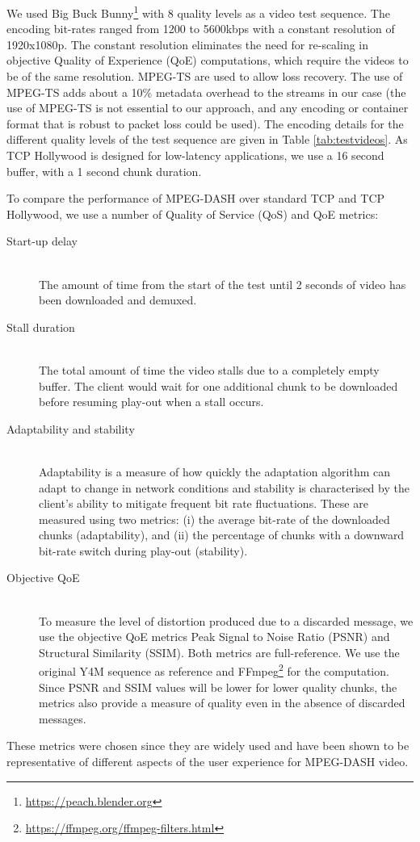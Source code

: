 We used Big Buck Bunny\footnote{\url{https://peach.blender.org}} with 8 quality levels as a video 
test sequence. The encoding bit-rates ranged from 1200 to 5600kbps with a constant resolution of 
1920x1080p. The constant resolution eliminates the need for re-scaling in objective Quality of 
Experience (QoE)
computations, which require the videos to be of the same resolution. MPEG-TS
are used to allow loss recovery. The use of MPEG-TS adds about a
10\% metadata overhead to the streams in our case (the use of MPEG-TS is not
essential to our approach, and any encoding or container format that is robust to packet loss
could be used). The encoding details for the different quality levels of
the test sequence are given in Table \ref{tab:testvideos}.
As TCP Hollywood is designed for low-latency applications, we use a 16 second buffer, with
a 1 second chunk duration.

To compare the performance of MPEG-DASH over standard TCP and TCP Hollywood, we use a number of 
Quality of Service (QoS) and QoE metrics: 
\begin{description}
    \item[Start-up delay] \hfill \\
        The amount of time from the start of the test until 2 seconds of video has been downloaded and demuxed.
    \item[Stall duration] \hfill \\
        The total amount of time the video stalls due to a completely empty buffer. The
        client would wait for one additional chunk to be downloaded before resuming play-out
        when a stall occurs.
    \item[Adaptability and stability] \hfill \\
        Adaptability is a measure of how quickly the adaptation algorithm can adapt to change in network conditions and stability is characterised by the client's ability to mitigate frequent bit rate fluctuations. These are measured using two metrics: (i) the average bit-rate of the downloaded chunks (adaptability), and (ii) the percentage of chunks with a downward bit-rate switch during play-out (stability).  
    \item[Objective QoE] \hfill \\
        To measure the level of distortion produced due to a discarded message, we use the 
        objective QoE metrics Peak Signal to Noise Ratio (PSNR) and Structural Similarity
        (SSIM). Both metrics are full-reference. We use the original Y4M sequence as
        reference and FFmpeg\footnote{\url{https://ffmpeg.org/ffmpeg-filters.html}} for the
        computation. Since PSNR and SSIM values will be lower for lower quality chunks, the
        metrics also provide a measure of quality even in the absence of discarded messages.
\end{description}

These metrics were chosen since they are widely used and have been shown to
be representative of different aspects of the user experience for MPEG-DASH
video.
